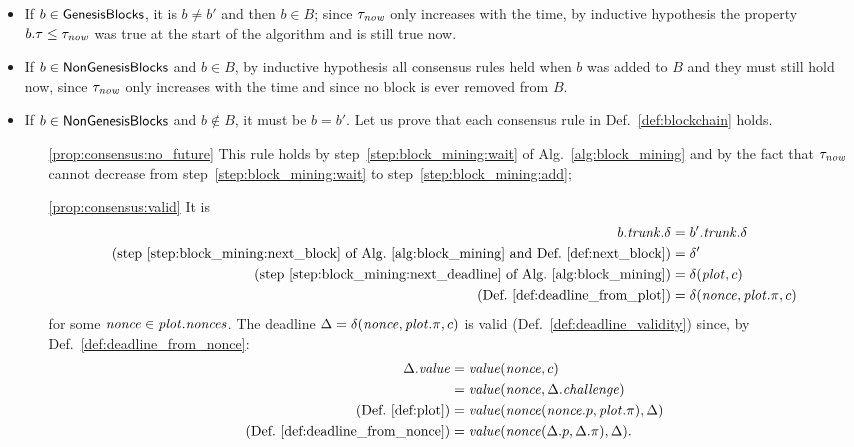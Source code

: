   \begin{itemize}
  \item If $b\in{\mathsf{GenesisBlocks}}$, it is $b\not=b'$ and then $b\in B$; since $\tau_{\mathit{now}}$ only
    increases with the time, by inductive hypothesis
    the property $b.\tau\le\tau_{\mathit{now}}$ was true at the start of the
    algorithm and is still true now.
  \item If $b\in{\mathsf{NonGenesisBlocks}}$ and $b\in B$, by inductive hypothesis
    all consensus rules held when $b$ was added to
    $B$ and they must still hold now, since $\tau_{\mathit{now}}$ only
    increases with the time and since no block is ever removed from $B$.
  \item If $b\in{\mathsf{NonGenesisBlocks}}$ and $b\not\in B$, it must be $b=b'$. Let us prove that each consensus rule
    in Def.~\ref{def:blockchain} holds.
    \begin{itemize}
    \item[\ref{prop:consensus:no_future}] This rule holds by step~\ref{step:block_mining:wait} of
      Alg.~\ref{alg:block_mining} and by the fact
      that $\tau_{\mathit{now}}$ cannot decrease from step~\ref{step:block_mining:wait} to
      step~\ref{step:block_mining:add};
    \item[\ref{prop:consensus:valid}] It is
      \begin{align*}
        b.{\mathit{trunk}}.\delta&=b'.{\mathit{trunk}}.\delta\\
        \text{(step~\ref{step:block_mining:next_block} of Alg.~\ref{alg:block_mining} and Def.~\ref{def:next_block})}&=\delta'\\
        \text{(step~\ref{step:block_mining:next_deadline} of Alg.~\ref{alg:block_mining})}&=
        \delta({\mathit{plot}},c)\\
        \text{(Def.~\ref{def:deadline_from_plot})}&=\delta({\mathit{nonce}},{\mathit{plot}}.\pi,c)
      \end{align*}
      for some ${\mathit{nonce}}\in{\mathit{plot}}.{\mathit{nonces}}$. The deadline $\Delta=\delta({\mathit{nonce}},{\mathit{plot}}.\pi,c)$ is valid
      (Def.~\ref{def:deadline_validity}) since, by Def.~\ref{def:deadline_from_nonce}:
      \begin{align*}
        \Delta.\mathit{value}&=\mathit{value}({\mathit{nonce}},c)\\
        &=\mathit{value}({\mathit{nonce}},\Delta.{\mathit{challenge}})\\
        \text{(Def.~\ref{def:plot})}&=\mathit{value}({\mathit{nonce}}({\mathit{nonce}}.p,{\mathit{plot}}.\pi),\Delta)\\
        \text{(Def.~\ref{def:deadline_from_nonce})}&=\mathit{value}({\mathit{nonce}}(\Delta.p,\Delta.\pi),\Delta).
      \end{align*}

\end{itemize}
\end{itemize}
